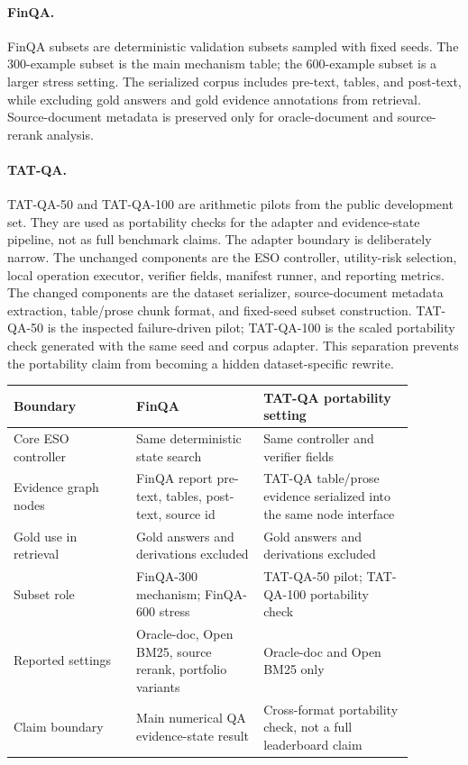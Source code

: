 \paragraph{FinQA.}
FinQA subsets are deterministic validation subsets sampled with fixed seeds.
The 300-example subset is the main mechanism table; the 600-example subset is a
larger stress setting.  The serialized corpus includes pre-text, tables, and
post-text, while excluding gold answers and gold evidence annotations from
retrieval.  Source-document metadata is preserved only for oracle-document and
source-rerank analysis.

\paragraph{TAT-QA.}
TAT-QA-50 and TAT-QA-100 are arithmetic pilots from the public development set.
They are used as portability checks for the adapter and evidence-state pipeline,
not as full benchmark claims.
The adapter boundary is deliberately narrow.  The unchanged components are the
ESO controller, utility-risk selection, local operation executor, verifier
fields, manifest runner, and reporting metrics.  The changed components are the
dataset serializer, source-document metadata extraction, table/prose chunk
format, and fixed-seed subset construction.  TAT-QA-50 is the inspected
failure-driven pilot; TAT-QA-100 is the scaled portability check generated with
the same seed and corpus adapter.  This separation prevents the portability
claim from becoming a hidden dataset-specific rewrite.

\begin{center}
\small
\begin{tabular}{p{0.27\linewidth}p{0.28\linewidth}p{0.33\linewidth}}
\hline
Boundary & FinQA & TAT-QA portability setting \\
\hline
Core ESO controller & Same deterministic state search & Same controller and
verifier fields \\
Evidence graph nodes & FinQA report pre-text, tables, post-text, source id &
TAT-QA table/prose evidence serialized into the same node interface \\
Gold use in retrieval & Gold answers and derivations excluded & Gold answers
and derivations excluded \\
Subset role & FinQA-300 mechanism; FinQA-600 stress & TAT-QA-50 pilot;
TAT-QA-100 portability check \\
Reported settings & Oracle-doc, Open BM25, source rerank, portfolio variants &
Oracle-doc and Open BM25 only \\
Claim boundary & Main numerical QA evidence-state result & Cross-format
portability check, not a full leaderboard claim \\
\hline
\end{tabular}
\end{center}

